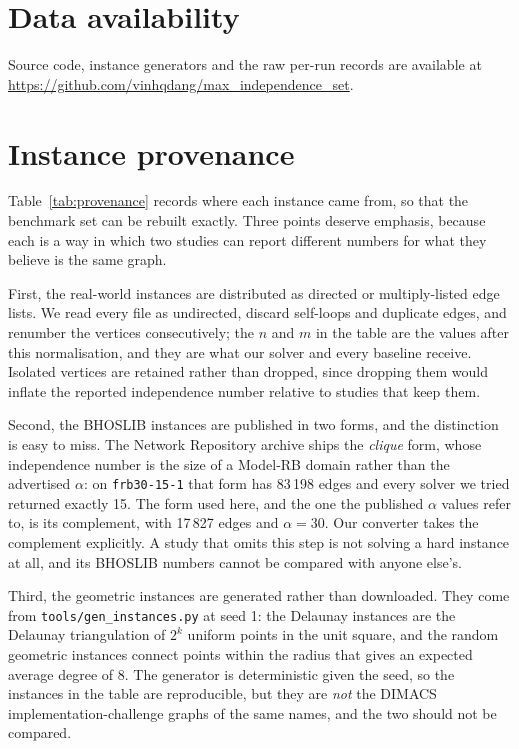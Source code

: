 \documentclass[preprint,12pt]{elsarticle}
\theoremstyle{definition}
\begin{document}
\section*{Data availability}
Source code, instance generators and the raw per-run records are available at
\url{https://github.com/vinhqdang/max_independence_set}.

\appendix

\section{Instance provenance}
\label{app:provenance}

Table~\ref{tab:provenance} records where each instance came from, so that the
benchmark set can be rebuilt exactly. Three points deserve emphasis, because each
is a way in which two studies can report different numbers for what they believe
is the same graph.

First, the real-world instances are distributed as directed or multiply-listed
edge lists. We read every file as undirected, discard self-loops and duplicate
edges, and renumber the vertices consecutively; the $n$ and $m$ in the table are
the values after this normalisation, and they are what our solver and every
baseline receive. Isolated vertices are retained rather than dropped, since
dropping them would inflate the reported independence number relative to studies
that keep them.

Second, the BHOSLIB instances are published in two forms, and the distinction is
easy to miss. The Network Repository archive ships the \emph{clique} form, whose
independence number is the size of a Model-RB domain rather than the advertised
$\alpha$: on \texttt{frb30-15-1} that form has 83\,198 edges and every solver we
tried returned exactly 15. The form used here, and the one the published
$\alpha$ values refer to, is its complement, with 17\,827 edges and $\alpha=30$.
Our converter takes the complement explicitly. A study that omits this step is
not solving a hard instance at all, and its BHOSLIB numbers cannot be compared
with anyone else's.

Third, the geometric instances are generated rather than downloaded. They come
from \texttt{tools/gen\_instances.py} at seed 1: the Delaunay instances are the
Delaunay triangulation of $2^{k}$ uniform points in the unit square, and the
random geometric instances connect points within the radius that gives an
expected average degree of 8. The generator is deterministic given the seed, so
the instances in the table are reproducible, but they are \emph{not} the DIMACS
implementation-challenge graphs of the same names, and the two should not be
compared.
\end{document}
